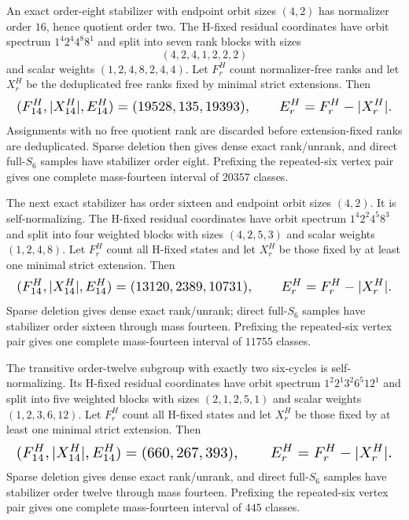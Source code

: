 \documentclass{article}
\newcommand{\fitmath}[1]{\resizebox{0.99\linewidth}{!}{$\displaystyle #1$}}
\begin{document}
An exact order-eight stabilizer with endpoint orbit sizes $(4,2)$ has normalizer
order $16$, hence quotient order two. The H-fixed residual coordinates have
orbit spectrum $1^4 2^4 4^8 8^1$ and split into seven rank blocks with sizes
\[
  (4,2,4,1,2,2,2)
\]
and scalar weights $(1,2,4,8,2,4,4)$. Let $F_r^H$ count normalizer-free ranks
and let $X_r^H$ be the deduplicated free ranks fixed by minimal strict
extensions. Then
\begin{equation}
  \fitmath{%
    (F_{14}^H,|X_{14}^H|,E_{14}^H)=(19528,135,19393),
    \qquad E_r^H=F_r^H-|X_r^H|.
  }
  \label{eq:optimization-crazy-sextuple-s6-full-order8-42-ranking}
\end{equation}
Assignments with no free quotient rank are discarded before extension-fixed
ranks are deduplicated. Sparse deletion then gives dense exact rank/unrank, and
direct full-$S_6$ samples have stabilizer order eight. Prefixing the
repeated-six vertex pair gives one complete mass-fourteen interval of $20357$
classes.

The next exact stabilizer has order sixteen and endpoint orbit sizes $(4,2)$.
It is self-normalizing. The H-fixed residual coordinates have orbit spectrum
$1^4 2^2 4^5 8^3$ and split into four weighted blocks with sizes
$(4,2,5,3)$ and scalar weights $(1,2,4,8)$. Let $F_r^H$ count all H-fixed
states and let $X_r^H$ be those fixed by at least one minimal strict extension.
Then
\begin{equation}
  \fitmath{%
    (F_{14}^H,|X_{14}^H|,E_{14}^H)=(13120,2389,10731),
    \qquad E_r^H=F_r^H-|X_r^H|.
  }
  \label{eq:optimization-crazy-sextuple-s6-full-order16-42-ranking}
\end{equation}
Sparse deletion gives dense exact rank/unrank; direct full-$S_6$ samples have
stabilizer order sixteen through mass fourteen. Prefixing the repeated-six
vertex pair gives one complete mass-fourteen interval of $11755$ classes.

The transitive order-twelve subgroup with exactly two six-cycles is
self-normalizing. Its H-fixed residual coordinates have orbit spectrum
$1^2 2^1 3^2 6^5 12^1$ and split into five weighted blocks with sizes
$(2,1,2,5,1)$ and scalar weights $(1,2,3,6,12)$. Let $F_r^H$ count all
H-fixed states and let $X_r^H$ be those fixed by at least one minimal strict
extension. Then
\begin{equation}
  \fitmath{%
    (F_{14}^H,|X_{14}^H|,E_{14}^H)=(660,267,393),
    \qquad E_r^H=F_r^H-|X_r^H|.
  }
  \label{eq:optimization-crazy-sextuple-s6-full-transitive-order12-ranking}
\end{equation}
Sparse deletion gives dense exact rank/unrank, and direct full-$S_6$ samples
have stabilizer order twelve through mass fourteen. Prefixing the repeated-six
vertex pair gives one complete mass-fourteen interval of $445$ classes.
\end{document}
